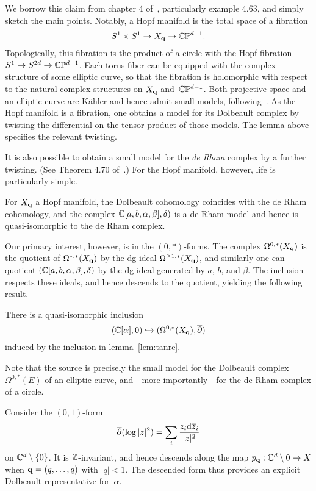 We borrow this claim from chapter 4 of~\cite{Tanre}, particularly example 4.63,
and simply sketch the main points.
Notably, a Hopf manifold is the total space of a fibration
\[
S^1 \times S^1 \to X_{\bf q} \to \mathbb C\mathbb P^{d-1}.
\]
Topologically, this fibration is the product of a circle with the Hopf fibration $S^1 \to S^{2d} \to \mathbb C\mathbb P^{d-1}$. 
Each torus fiber can be equipped with the complex structure of some elliptic curve, so that the fibration is holomorphic with respect to the natural complex structures on $X_{\bf q}$ and~$\mathbb C\mathbb P^{d-1}$.
Both projective space and an elliptic curve are K\"ahler and hence admit small models, 
following~\cite{DGMS}.
As the Hopf manifold is a fibration, one obtains a model for its Dolbeault complex by twisting the differential on the tensor product of those models.
The lemma above specifies the relevant twisting.

It is also possible to obtain a small model for the {\em de Rham} complex by a further twisting. 
(See Theorem 4.70 of~\cite{Tanre}.)
For the Hopf manifold, however, life is particularly simple.

\begin{lem}
For $X_{\bf q}$ a Hopf manifold,
the Dolbeault cohomology coincides with the de Rham cohomology, and the complex $\mathbb C[a, b, \alpha, \beta], \delta)$ is a de Rham model and hence is quasi-isomorphic to the de Rham complex.
\end{lem}

Our primary interest, however, is in the $(0,*)$-forms.
The complex $\Omega^{0, *}(X_{\bf q})$ is the quotient of $\Omega^{*, *}(X_{\bf q})$ by the dg ideal $\Omega^{\geq 1, *}(X_{\bf q})$,
and similarly one can quotient $(\mathbb C[a, b, \alpha, \beta], \delta)$ by the dg ideal generated by $a$, $b$, and $\beta$. 
The inclusion respects these ideals, and hence descends to the quotient, yielding the following result.

\begin{lem}
There is a quasi-isomorphic inclusion 
\[
(\mathbb C[\alpha], 0) \hookrightarrow (\Omega^{0,*}(X_{\bf q}), \overline{\partial})
\]
induced by the inclusion in lemma~\ref{lem:tanre}.
\end{lem}

Note that the source is precisely the small model for the Dolbeault complex $\Omega^{0, *}(E)$ of an elliptic curve,
and---more importantly---for the de Rham complex of a circle.

\begin{eg}
Consider 
the $(0,1)$-form 
\[
\overline{\partial} (\log |z|^2) = \sum_i \frac{z_i{\rm d} \overline{z}_i}{|z|^2} 
\]
on $\mathbb C^d \setminus \{0\}$.
It is $\mathbb Z$-invariant, and hence descends along the map $p_{\bf q} : \mathbb C^d \setminus 0 \to X$
when ${\bf q} = (q,\ldots,q)$ with $|q| < 1$.
The descended form thus provides an explicit Dolbeault representative for~$\alpha$.
\end{eg}


